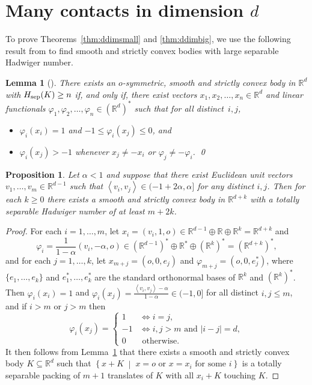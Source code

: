 \documentclass[a4paper,12pt]{article}
\theoremstyle{plain}
\newtheorem{lemma}[theorem]{Lemma}
\newtheorem{proposition}[theorem]{Proposition}
\theoremstyle{definition}
\newcommand{\setbuilder}[2]{\left\{#1\;\middle|\;#2\right\}}
\newcommand{\fhi}{\varphi}
\newcommand{\ipr}[2]{\left\langle #1, #2 \right\rangle}
\newcommand{\numbersystem}[1]{\mathbb{#1}}
\newcommand{\bR}{\numbersystem{R}}
\newcommand{\Hsep}{H_{\textnormal{sep}}}
\begin{document}
\section{Many contacts in dimension \texorpdfstring{$d$}{d}}\label{sec:ddim}
To prove Theorems~\ref{thm:ddimsmall} and \ref{thm:ddimbig}, we use the following result from \cite{BN18} to find smooth and strictly convex bodies with large separable Hadwiger number.
\begin{lemma}[{\cite[Lemma~2.1 and Note~2.2]{BN18}}]\label{lem:BN18}
There exists an $o$-symmetric, smooth and strictly convex body in $\bR^d$ with $\Hsep(K)\geq n$ if, and only if, there exist vectors $x_1,x_2,\dots,x_n\in\bR^d$ and linear functionals $\fhi_1,\fhi_2,\dots,\fhi_n\in(\bR^d)^*$ such that for all distinct~$i,j$,
\begin{itemize}
\item $\fhi_i(x_i)=1$ and $-1\leq \fhi_i(x_j)\leq 0$, and
\item $\fhi_i(x_j)>-1$ whenever $x_j\neq -x_i$ or $\fhi_j\neq -\fhi_i$. \qed
\end{itemize} 
\end{lemma}
\begin{proposition}\label{prop:exist}
Let $\alpha<1$ and suppose that there exist Euclidean unit vectors 
$v_1,\dots,v_m\in\bR^{d-1}$ such that $\ipr{v_i}{v_j} 
\in 
(-1+2\alpha,\alpha]$ for any distinct $i,j$.
Then for each $k\geq 0$ there exists a smooth and strictly convex body in $\bR^{d+k}$ with a 
totally separable Hadwiger number of at least $m+2k$.
\end{proposition}
\begin{proof}
For each $i=1,\dots,m$,
let $x_i = (v_i,1,o)\in\bR^{d-1}\oplus\bR\oplus\bR^k=\bR^{d+k}$ and
\[\fhi_i = \frac{1}{1-\alpha}(v_i,-\alpha,o)\in\left(\bR^{d-1}\right)^*\oplus\bR^*\oplus(\bR^k)^*=\left(\bR^{d+k}\right)^*,\]
and for each $j=1,\dots,k$, let $x_{m+j}=(o,0,e_j)$ and $\fhi_{m+j}=(o,0,e_j^*)$, where $\{e_1,\dots,e_k\}$ and $e_1^*,\dots,e_k^*$ are the standard orthonormal bases of $\bR^k$ and $(\bR^k)^*$.
Then $\fhi_i(x_i) = 1$ and $\fhi_i(x_j) = 
\frac{\ipr{v_i}{v_j}-\alpha}{1-\alpha}\in(-1,0]$ for all distinct $i,j\leq m$,
and if $i>m$ or $j>m$ then
\[ \fhi_i(x_j)=\begin{cases}
        1  &\iff i=j,\\
        -1 &\iff i,j>m \text{ and } |i-j|=d,\\
        0 &\text{ otherwise}.
    \end{cases}\]
It then follows from Lemma~\ref{lem:BN18} that there exists a 
smooth and strictly convex body $K\subseteq\bR^{d}$ such that 
$\setbuilder{x+K}{x=o\text{ or }x=x_i\text{ for some }i}$ is a totally 
separable packing of $m+1$ translates of $K$ with all $x_i+K$ touching $K$.
\end{proof}
\end{document}
